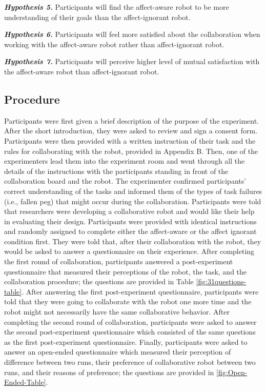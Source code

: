 \documentclass[12pt]{report}
\begin{document}
\textit{\textbf{Hypothesis 5.}} Participants will find the affect-aware robot to be
more understanding of their goals than the affect-ignorant robot.

\textit{\textbf{Hypothesis 6.}} Participants will feel more satisfied about the
collaboration when working with the affect-aware robot rather than
affect-ignorant robot.

\textit{\textbf{Hypothesis 7.}} Participants will perceive higher level of mutual
satisfaction with the affect-aware robot than affect-ignorant robot.

\subsection{Procedure}
\label{sec:procedure}
Participants were first given a brief description of the purpose of the
experiment. After the short introduction, they were asked to review and sign a
consent form. Participants were then provided with a written instruction of
their task and the rules for collaborating with the robot, provided in Appendix
B. Then, one of the experimenters lead them into the experiment room and 
went through all the details of the instructions with the participants
standing in front of the collaboration board and the robot. The experimenter
confirmed participants' correct understanding of the tasks and informed them
of the types of task failures (i.e., fallen peg) that might occur during the
collaboration. Participants were told that researchers were developing a
collaborative robot and would like their help in evaluating their design.
Participants were provided with identical instructions and randomly assigned to
complete either the affect-aware or the affect ignorant condition first. They
were told that, after their collaboration with the robot, they would be asked to
answer a questionnaire on their experience. After completing the first round of
collaboration, participants answered a post-experiment questionnaire that
measured their perceptions of the robot, the task, and the collaboration
procedure; the questions are provided in Table \ref{fig:31questions-table}.
After answering the first post-experiment questionnaire, participants were told
that they were going to collaborate with the robot one more time and the robot
might not necessarily have the same collaborative behavior. After completing the
second round of collaboration, participants were asked to answer the second
post-experiment questionnaire which consisted of the same questions as the first
post-experiment questionnaire. Finally, participants were asked to answer an
open-ended questionnaire which measured their perception of difference between
two runs, their preference of collaborative robot between two runs, and their
reasons of preference; the questions are provided in \ref{fig:Open-Ended-Table}.
\end{document}
